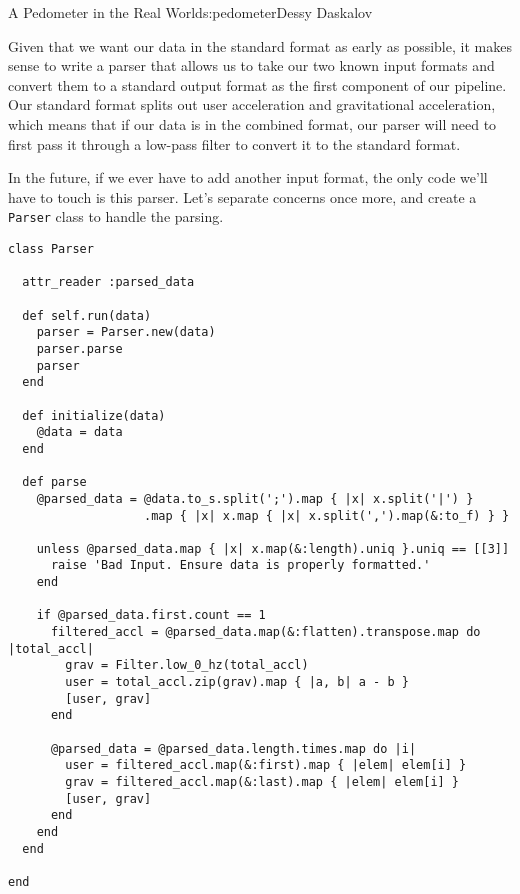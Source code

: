 \begin{aosachapter}{A Pedometer in the Real World}{s:pedometer}{Dessy Daskalov}
\label{parsing}

Given that we want our data in the standard format as early as possible,
it makes sense to write a parser that allows us to take our two known
input formats and convert them to a standard output format as the first
component of our pipeline. Our standard format splits out user
acceleration and gravitational acceleration, which means that if our
data is in the combined format, our parser will need to first pass it
through a low-pass filter to convert it to the standard format.


In the future, if we ever have to add another input format, the only
code we'll have to touch is this parser. Let's separate concerns once
more, and create a \texttt{Parser} class to handle the parsing.

\begin{verbatim}
class Parser

  attr_reader :parsed_data

  def self.run(data)
    parser = Parser.new(data)
    parser.parse
    parser
  end

  def initialize(data)
    @data = data
  end

  def parse
    @parsed_data = @data.to_s.split(';').map { |x| x.split('|') }
                   .map { |x| x.map { |x| x.split(',').map(&:to_f) } }

    unless @parsed_data.map { |x| x.map(&:length).uniq }.uniq == [[3]]
      raise 'Bad Input. Ensure data is properly formatted.'
    end

    if @parsed_data.first.count == 1
      filtered_accl = @parsed_data.map(&:flatten).transpose.map do |total_accl|
        grav = Filter.low_0_hz(total_accl)
        user = total_accl.zip(grav).map { |a, b| a - b }
        [user, grav]
      end

      @parsed_data = @parsed_data.length.times.map do |i|
        user = filtered_accl.map(&:first).map { |elem| elem[i] }
        grav = filtered_accl.map(&:last).map { |elem| elem[i] }
        [user, grav]
      end
    end
  end

end
\end{verbatim}


\end{aosachapter}
